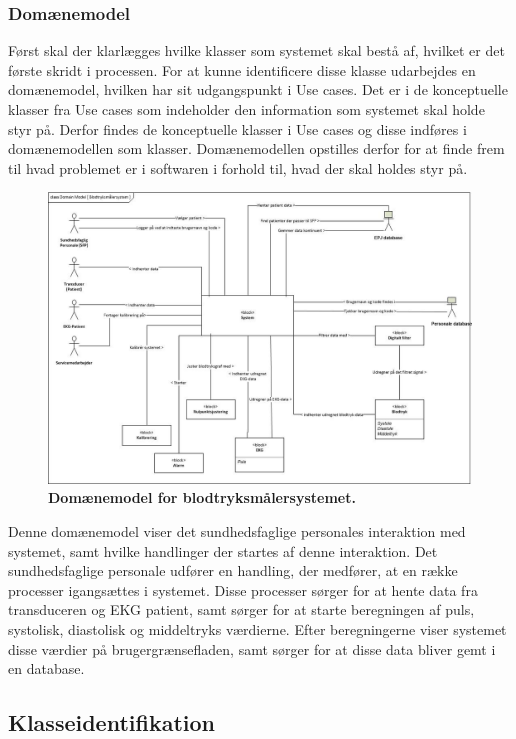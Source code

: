 \subsubsection{Domænemodel}
Først skal der klarlægges hvilke klasser som systemet skal bestå af, hvilket er det første skridt i processen. For at kunne identificere disse klasse udarbejdes en domænemodel, hvilken har sit udgangspunkt i Use cases. Det er i de konceptuelle klasser fra Use cases som indeholder den information som systemet skal holde styr på. Derfor findes de konceptuelle klasser i Use cases og disse indføres i domænemodellen som klasser. Domænemodellen opstilles derfor for at finde frem til hvad problemet er i softwaren i forhold til, hvad der skal holdes styr på.
\begin{figure}[H]
\includegraphics[width =1.0\textwidth , center]{billeder/DM}
\caption{\textbf{Domænemodel for blodtryksmålersystemet.}}
\end{figure}
Denne domænemodel viser det sundhedsfaglige personales interaktion med systemet, samt hvilke handlinger der startes af denne interaktion. Det sundhedsfaglige personale udfører en handling, der medfører, at en række processer igangsættes i systemet. Disse processer sørger for at hente data fra transduceren og EKG patient, samt sørger for at starte beregningen af puls, systolisk, diastolisk og middeltryks værdierne. Efter beregningerne viser systemet disse værdier på brugergrænsefladen, samt sørger for at disse data bliver gemt i en database.
\newpage
\subsection{Klasseidentifikation}
